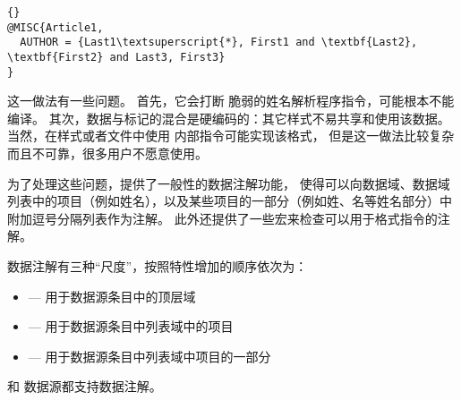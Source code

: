 \begin{lstlisting}[style=bibtex]{}
@MISC{Article1,
  AUTHOR = {Last1\textsuperscript{*}, First1 and \textbf{Last2}, \textbf{First2} and Last3, First3}
}
\end{lstlisting}
%
这一做法有一些问题。
首先，它会打断 \BibTeX 脆弱的姓名解析程序指令，可能根本不能编译。
其次，数据与标记的混合是硬编码的：其它样式不易共享和使用该数据。
当然，在样式或者文件中使用 \biblatex 内部指令可能实现该格式，
但是这一做法比较复杂而且不可靠，很多用户不愿意使用。

为了处理这些问题，\biblatex 提供了一般性的数据注解功能，
使得可以向数据域、数据域列表中的项目（例如姓名），以及某些项目的一部分（例如姓、名等姓名部分）中附加逗号分隔列表作为注解。
此外还提供了一些宏来检查可以用于格式指令的注解。

数据注解有三种“尺度”，按照特性增加的顺序依次为：
\begin{itemize}
\item {}---%
用于数据源条目中的顶层域
\item {}---%
用于数据源条目中列表域中的项目
\item {}---%
用于数据源条目中列表域中项目的一部分
\end{itemize}
%
\BibTeX 和 \biblatexml 数据源都支持数据注解。



